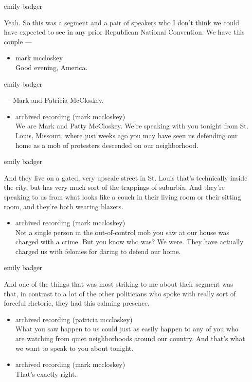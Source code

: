 emily badger

Yeah. So this was a segment and a pair of speakers who I don't think we
could have expected to see in any prior Republican National Convention.
We have this couple ---

\begin{itemize}
\tightlist
\item
  mark mccloskey\\
  Good evening, America.
\end{itemize}

emily badger

--- Mark and Patricia McCloskey.

\begin{itemize}
\tightlist
\item
  archived recording (mark mccloskey)\\
  We are Mark and Patty McCloskey. We're speaking with you tonight from
  St. Louis, Missouri, where just weeks ago you may have seen us
  defending our home as a mob of protesters descended on our
  neighborhood.
\end{itemize}

emily badger

And they live on a gated, very upscale street in St. Louis that's
technically inside the city, but has very much sort of the trappings of
suburbia. And they're speaking to us from what looks like a couch in
their living room or their sitting room, and they're both wearing
blazers.

\begin{itemize}
\tightlist
\item
  archived recording (mark mccloskey)\\
  Not a single person in the out-of-control mob you saw at our house was
  charged with a crime. But you know who was? We were. They have
  actually charged us with felonies for daring to defend our home.
\end{itemize}

emily badger

And one of the things that was most striking to me about their segment
was that, in contrast to a lot of the other politicians who spoke with
really sort of forceful rhetoric, they had this calming presence.

\begin{itemize}
\item
  archived recording (patricia mccloskey)\\
  What you saw happen to us could just as easily happen to any of you
  who are watching from quiet neighborhoods around our country. And
  that's what we want to speak to you about tonight.
\item
  archived recording (mark mccloskey)\\
  That's exactly right.
\end{itemize}

